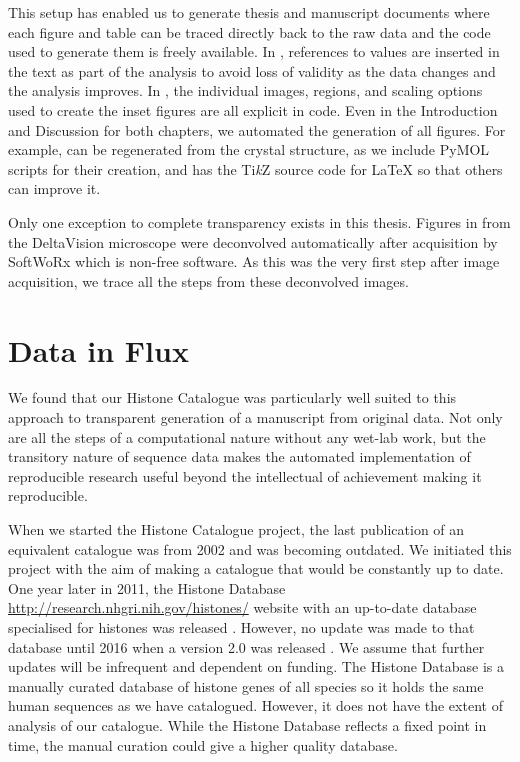 This setup has enabled us to generate thesis and manuscript documents where each
figure and table can be traced directly back to the raw
data and the code used to generate them is freely
available.
In
, references to values are inserted in the
text as part of the analysis to avoid loss of validity as the data
changes and the analysis improves.  In , the
individual images, regions, and scaling options used to create the
inset figures are all explicit in code.  Even in the Introduction and
Discussion for both chapters, we
automated the generation of all figures.  For example,
 can be regenerated from the
crystal structure, as we include PyMOL
scripts for their creation, and
 has the Ti\textit{k}Z source code
for \LaTeX{} so that
others can improve it.

Only one exception to complete transparency
exists in this thesis.  Figures in
 from the DeltaVision microscope were deconvolved
automatically after
acquisition by SoftWoRx which is non-free software.
As this was the very first step
after image acquisition, we trace all the steps from these
deconvolved images.


\section{Data in Flux}

We found that our Histone Catalogue 
was particularly well suited
to this approach to transparent generation of a manuscript from
original data.  Not only are all the steps of a computational
nature without any wet-lab work, but the transitory nature of sequence data
makes the automated implementation of reproducible research useful
beyond the intellectual of achievement making it reproducible.

When we started the Histone Catalogue project, the last publication of
an equivalent catalogue
was from 2002 and was becoming outdated.  We initiated
this project with the aim of making a catalogue that would be
constantly up to date.  One year later in 2011, the Histone Database
\url{http://research.nhgri.nih.gov/histones/}
website with an up-to-date database specialised for histones
was released \citep{histonedb-2011}.
However, no update was made to that database until 2016 when a version 2.0
was released \citep{histonedb-2016}.
We assume that further updates will
be infrequent and dependent on funding.
The Histone Database is a manually curated database of histone
genes of all species so it holds the same human sequences as we have
catalogued.
However, it does not have the extent of analysis of our catalogue.
While the Histone Database reflects a fixed point in time,
the manual curation could give a higher quality database.

